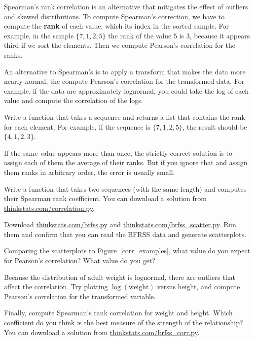 \documentclass[12pt]{book}
\begin{document}
Spearman's rank correlation is an alternative that mitigates the
effect of outliers and skewed distributions.  To compute Spearman's
correction, we have to compute the {\bf rank} of each value, which its
index in the sorted sample.  For example, in the sample $\{ 7, 1, 2, 5
\}$ the rank of the value 5 is 3, because it appears third if we sort
the elements.  Then we compute Pearson's correlation for the ranks.

An alternative to Spearman's is to apply a transform that makes the
data more nearly normal, the compute Pearson's correlation for the
transformed data.  For example, if the data are approximately
lognormal, you could take the log of each value and compute the
correlation of the logs.

\begin{ex}

Write a function that takes a sequence and returns a list that
contains the rank for each element.  For example, if the sequence is
$\{ 7, 1, 2, 5 \}$, the result should be $\{ 4, 1, 2, 3 \}$.

If the same value appears more than once, the strictly correct
solution is to assign each of them the average of their ranks.  But if
you ignore that and assign them ranks in arbitrary order, the error is
usually small.

Write a function that takes two sequences (with the same length) and
computes their Spearman rank coefficient.  You can download a solution
from \url{thinkstats.com/correlation.py}.

\end{ex}


\begin{ex}

Download \url{thinkstats.com/brfss.py} and
\url{thinkstats.com/brfss_scatter.py}.  Run them and confirm that you
can read the BFRSS data and generate scatterplots.

Comparing the scatterplots to Figure~\ref{corr_examples}, what value
do you expect for Pearson's correlation?  What value do you get?

Because the distribution of adult weight is lognormal, there are
outliers that affect the correlation.  Try plotting
$\log(\mathrm{weight})$ versus height, and compute Pearson's
correlation for the transformed variable.

Finally, compute Spearman's rank correlation for weight and height.
Which coefficient do you think is the best measure of the strength of
the relationship?  You can download a solution from
\url{thinkstats.com/brfss_corr.py}.

\end{ex}
\end{document}
